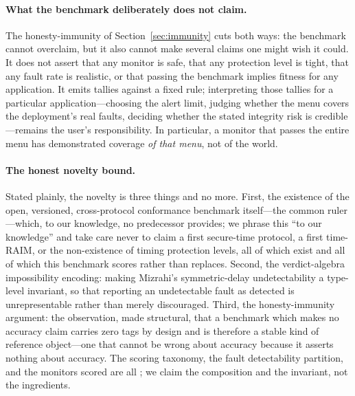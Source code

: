 \paragraph{What the benchmark deliberately does not claim.}
The honesty-immunity of Section~\ref{sec:immunity} cuts both ways: the benchmark
cannot overclaim, but it also cannot make several claims one might wish it could. It
does not assert that any monitor is safe, that any protection level is tight, that
any fault rate is realistic, or that passing the benchmark implies fitness for any
application. It emits tallies against a fixed rule; interpreting those tallies for a
particular application---choosing the alert limit, judging whether the menu covers
the deployment's real faults, deciding whether the stated integrity risk is
credible---remains the user's responsibility. In particular, a monitor that passes
the entire menu has demonstrated coverage \emph{of that menu}, not of the world.

\paragraph{The honest novelty bound.}
Stated plainly, the novelty is three things and no more. First, the existence of
the open, versioned, cross-protocol conformance benchmark itself---the common
ruler---which, to our knowledge, no predecessor provides; we phrase this ``to our
knowledge'' and take care never to claim a first secure-time protocol, a first
time-RAIM, or the non-existence of timing protection levels, all of which exist and
all of which this benchmark scores rather than replaces. Second, the
verdict-algebra impossibility encoding: making Mizrahi's symmetric-delay
undetectability a type-level invariant, so that reporting an undetectable fault as
detected is unrepresentable rather than merely discouraged. Third, the
honesty-immunity argument: the observation, made structural, that a benchmark which
makes no accuracy claim carries zero \Validated{} tags by design and is therefore
a stable kind of reference object---one that cannot be wrong about accuracy because
it asserts nothing about accuracy. The scoring taxonomy, the fault
detectability partition, and the monitors scored are all \Cited{}; we claim the
composition and the invariant, not the ingredients.

